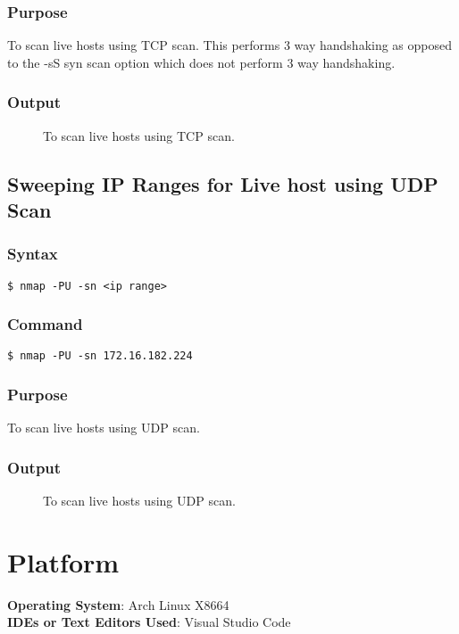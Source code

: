 \documentclass[11pt]{article}
\begin{document}
\subsubsection*{Purpose}
To scan live hosts using TCP scan. This performs 3 way handshaking as opposed to the -sS syn scan option which does not perform 3 way handshaking.

\subsubsection*{Output}
\begin{figure}[H]
    \centering
    \caption{To scan live hosts using TCP scan.}
    \label{fig:1}
\end{figure}


\subsection{Sweeping IP Ranges for Live host using UDP Scan}

\subsubsection{Syntax}
\begin{verbatim}
$ nmap -PU -sn <ip range>
\end{verbatim}

\subsubsection*{Command}
\begin{verbatim}
$ nmap -PU -sn 172.16.182.224
\end{verbatim}

\subsubsection*{Purpose}
To scan live hosts using UDP scan.

\subsubsection*{Output}
\begin{figure}[H]
    \centering
    \caption{To scan live hosts using UDP scan.}
    \label{fig:1}
\end{figure}


\section{Platform}
\textbf{Operating System}: Arch Linux X8664 \\
\textbf{IDEs or Text Editors Used}: Visual Studio Code\\
\end{document}
